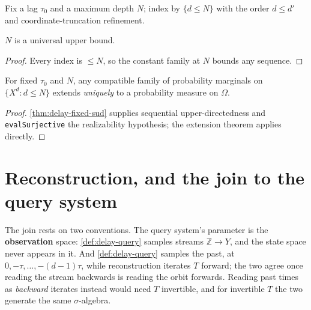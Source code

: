 \begin{definition}
\label{def:delay-fixed-lag}
\leanok
Fix a lag $\tau_0$ and a maximum depth $N$; index by $\{d \leq N\}$ with the
order $d \leq d'$ and coordinate-truncation refinement.
\end{definition}

\begin{theorem}
\label{thm:delay-fixed-sud}
\leanok
$N$ is a universal upper bound.
\end{theorem}

\begin{proof}
\leanok
{}
Every index is $\leq N$, so the constant family at $N$ bounds any sequence.
\end{proof}

\begin{theorem}
\label{thm:delay-extension}
\leanok
For fixed $\tau_0$ and $N$, any compatible family of probability marginals on
$\{X^d : d \leq N\}$ extends \emph{uniquely} to a probability measure on
$\Omega$.
\end{theorem}

\begin{proof}
\leanok
{}
\ref{thm:delay-fixed-sud} supplies sequential upper-directedness and
\texttt{evalSurjective} the realizability hypothesis; the extension theorem
applies directly.
\end{proof}

\section{Reconstruction, and the join to the query system}

The join rests on two conventions. The query system's parameter is the
\textbf{observation} space: \ref{def:delay-query} samples streams
$\mathbb{Z} \to Y$, and the state space never appears in it. And
\ref{def:delay-query} samples the past, at $0, -\tau, \dots, -(d-1)\tau$, while
reconstruction iterates $T$ forward; the two agree once reading the stream
backwards is reading the orbit forwards. Reading past times as \emph{backward}
iterates instead would need $T$ invertible, and for invertible $T$ the two
generate the same $\sigma$-algebra.

